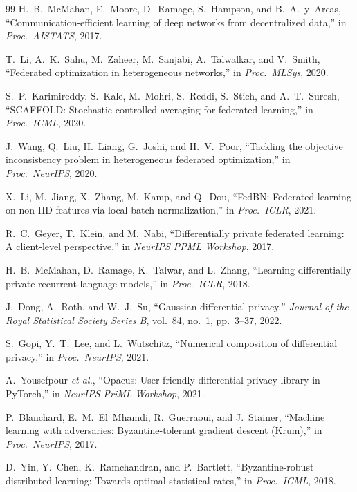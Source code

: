 \documentclass[12pt,a4paper]{article}
\theoremstyle{definition}
\theoremstyle{remark}
\begin{document}
\begin{thebibliography}{99}
H.~B.~McMahan, E.~Moore, D.~Ramage, S.~Hampson, and B.~A.~y~Arcas, ``Communication-efficient learning of deep networks from decentralized data,'' in \emph{Proc.\ AISTATS}, 2017.

T.~Li, A.~K.~Sahu, M.~Zaheer, M.~Sanjabi, A.~Talwalkar, and V.~Smith, ``Federated optimization in heterogeneous networks,'' in \emph{Proc.\ MLSys}, 2020.

S.~P.~Karimireddy, S.~Kale, M.~Mohri, S.~Reddi, S.~Stich, and A.~T.~Suresh, ``{SCAFFOLD}: Stochastic controlled averaging for federated learning,'' in \emph{Proc.\ ICML}, 2020.

J.~Wang, Q.~Liu, H.~Liang, G.~Joshi, and H.~V.~Poor, ``Tackling the objective inconsistency problem in heterogeneous federated optimization,'' in \emph{Proc.\ NeurIPS}, 2020.

X.~Li, M.~Jiang, X.~Zhang, M.~Kamp, and Q.~Dou, ``{FedBN}: Federated learning on non-{IID} features via local batch normalization,'' in \emph{Proc.\ ICLR}, 2021.

R.~C.~Geyer, T.~Klein, and M.~Nabi, ``Differentially private federated learning: A client-level perspective,'' in \emph{NeurIPS PPML Workshop}, 2017.

H.~B.~McMahan, D.~Ramage, K.~Talwar, and L.~Zhang, ``Learning differentially private recurrent language models,'' in \emph{Proc.\ ICLR}, 2018.

J.~Dong, A.~Roth, and W.~J.~Su, ``Gaussian differential privacy,'' \emph{Journal of the Royal Statistical Society Series B}, vol.~84, no.~1, pp.~3--37, 2022.

S.~Gopi, Y.~T.~Lee, and L.~Wutschitz, ``Numerical composition of differential privacy,'' in \emph{Proc.\ NeurIPS}, 2021.

A.~Yousefpour \emph{et al.}, ``{Opacus}: User-friendly differential privacy library in {PyTorch},'' in \emph{NeurIPS PriML Workshop}, 2021.

P.~Blanchard, E.~M.~El~Mhamdi, R.~Guerraoui, and J.~Stainer, ``Machine learning with adversaries: Byzantine-tolerant gradient descent ({Krum}),'' in \emph{Proc.\ NeurIPS}, 2017.

D.~Yin, Y.~Chen, K.~Ramchandran, and P.~Bartlett, ``{Byzantine}-robust distributed learning: Towards optimal statistical rates,'' in \emph{Proc.\ ICML}, 2018.


\end{thebibliography}
\end{document}
